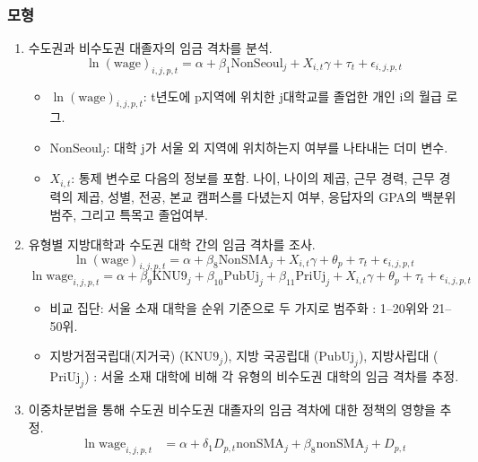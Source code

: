 \documentclass[aspectratio=169,xcolor=dvipsnames,handout]{beamer}
\begin{document}
\begin{frame}[allowframebreaks]
    \frametitle{모형}
    \begin{enumerate}[<+->]
        \item 수도권과 비수도권 대졸자의 임금 격차를 분석.
        \begin{equation}
        \ln{(\text{wage})}_{i,j,p,t} = \alpha + \beta_1 \text{NonSeoul}_j + X_{i,t} \gamma + \tau_t + \epsilon_{i,j,p,t}
        \end{equation}
        \begin{itemize}[<+->]
            \item $\ln{(\text{wage})}_{i,j,p,t}$: t년도에 p지역에 위치한 j대학교를 졸업한 개인 i의 월급 로그.
            \item $\text{NonSeoul}_j$: 대학 j가 서울 외 지역에 위치하는지 여부를 나타내는 더미 변수.
            \item $X_{i,t}$: 통제 변수로 다음의 정보를 포함. 나이, 나이의 제곱, 근무 경력, 근무 경력의 제곱, 성별, 전공, 본교 캠퍼스를 다녔는지 여부, 응답자의 GPA의 백분위 범주, 그리고 특목고 졸업여부. 
        \end{itemize}
    \framebreak%
        \item 유형별 지방대학과 수도권 대학 간의 임금 격차를 조사.
        \begin{equation}
            \ln{(\text{wage})}_{i,j,p,t} = \alpha + \beta_8 \text{NonSMA}_j + X_{i,t} \gamma + \theta_p + \tau_t + \epsilon_{i,j,p,t}
        \end{equation}
        \begin{equation}
            \ln{\text{wage}}_{i,j,p,t} = \alpha + \beta_9 \text{KNU9}_j + \beta_{10} \text{PubUj}_j + \beta_{11} \text{PriUj}_j + X_{i,t} \gamma + \theta_p + \tau_t + \epsilon_{i,j,p,t}
        \end{equation}
        \begin{itemize}[<+->]
            \item 비교 집단: 서울 소재 대학을 순위 기준으로 두 가지로 범주화 : 1–20위와 21–50위.
            \item 지방거점국립대(지거국) ($\text{KNU9}_j$), 지방 국공립대 ($\text{PubUj}_j$), 지방사립대 ($\text{PriUj}_j$) : 서울 소재 대학에 비해 각 유형의 비수도권 대학의 임금 격차를 추정.
        \end{itemize}
    \framebreak%
        \item 이중차분법을 통해 수도권 비수도권 대졸자의 임금 격차에 대한 정책의 영향을 추정.%
            \begin{align}
                \ln{\text{wage}}_{i,j,p,t} &= \alpha + \delta_1 D_{p,t} \text{nonSMA}_j + \beta_8 \text{nonSMA}_j + D_{p,t} \\ \nonumber

\end{align}
\end{enumerate}
\end{frame}
\end{document}
